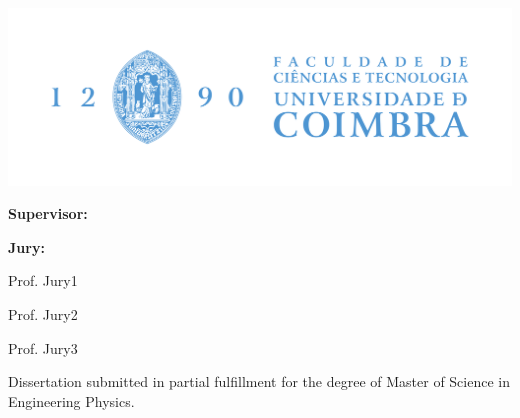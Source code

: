 \begin{titlepage}
    \begin{center}
    \includegraphics[width=\textwidth]{images/FCTUC_H_FundoClaro.png}
    
    \vspace{1cm}
    {\huge{\textbf{\thesistitle}}\par}
    
    \vspace{1cm}
    {\large{\textbf{Supervisor:}\\\supervisorname\par}}
    \vspace{5mm}
    
    \vspace{1cm}
    {\large{\textbf{Jury:}
    
    Prof. Jury1
    
    Prof. Jury2
    
    Prof. Jury3
    
    }}
    
    \vfill
    Dissertation submitted in partial fulfillment for the degree of Master of Science in Engineering Physics.
    
    \vspace{0.5cm}
    {\large \statedate\par}    
    
    
    \end{center}
    \end{titlepage}
